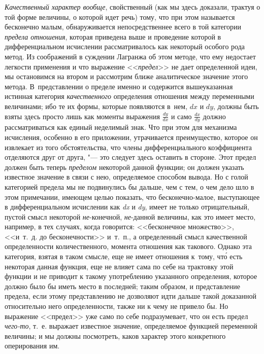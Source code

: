 {\em Качественный характер вообще}, свойственный (как мы здесь доказали,
трактуя о той форме величины, о которой идет речь) тому, что при этом
называется бесконечно малым, обнаруживается непосредственнее всего в той
категории {\em предела отношения}, которая приведена выше и проведение которой
в дифференциальном исчислении рассматривалось как некоторый особого рода метод.
Из соображений в суждении Лагранжа об этом методе, что ему недостает легкости
применения и что выражение <<{\em предел}>> не дает определенной идеи, мы
остановимся на втором и рассмотрим ближе аналитическое значение этого метода.
В~представлении о пределе именно и содержится вышеуказанная истинная категория
{\em качественного} определения отношения между переменными величинами; ибо те
их формы, которые появляются в~нем, $dx$ и $dy$, должны быть взяты
здесь просто лишь как моменты выражения $\frac{dy}{dx}$ и само $\frac{dx}{dy}$
должно рассматриваться как единый неделимый знак. Что при этом для механизма
исчисления, особенно в его приложении, утрачивается преимущество, которое он
извлекает из того обстоятельства, что члены дифференциального коэффициента
отделяются друг от друга, "--- это следует здесь оставить в стороне. Этот
предел должен быть теперь {\em пределом} некоторой данной функции; он должен
указать известное значение в связи с нею, определяемое способом вывода. Но с
голой категорией предела мы не подвинулись бы дальше, чем с тем, о чем дело шло
в этом примечании, имеющем целью показать, что бесконечно-малое, выступающее в
дифференциальном исчислении как {\em dx} и {\em dy}, имеет не только
отрицательный, пустой смысл некоторой {\em не}-конечной, {\em не}-данной
величины, как это имеет место, например, в тех случаях, когда говорится:
<<бесконечное множество>>, <<и~т.~д. до бесконечности>> и~т.~п., а определенный
смысл качественной определенности количественного, момента отношения как
такового. Однако эта категория, взятая в таком смысле, еще не имеет отношения
к~тому, чт\'{о} есть некоторая данная функция, еще не влияет сама по себе на
трактовку этой функции и не приводит к такому употреблению указанного
определения, которое должно было бы иметь место в последней; таким образом, и
представление предела, если этому представлению не дозволяют идти дальше такой
доказанной относительно него определенности, также ни к чему не привело бы. Но
выражение <<предел>> уже само по себе подразумевает, что он есть предел
{\em чего-то}, т.~е. выражает известное значение, определяемое функцией
переменной величины; и мы должны посмотреть, каков характер этого конкретного
оперирования им.

